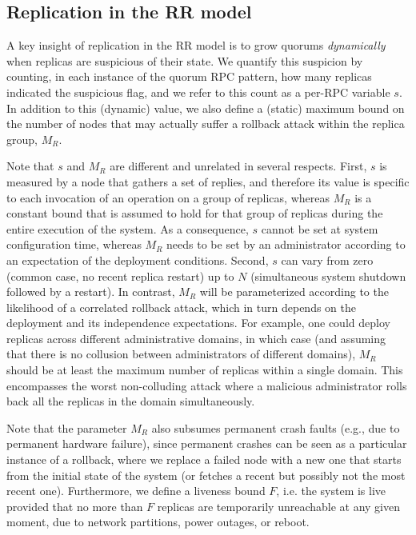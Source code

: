 \subsection{Replication in the \ac{RR} model}

A key insight of replication in the \ac{RR} model is to grow quorums
\emph{dynamically} when replicas are suspicious of their state.
We quantify this suspicion by counting, in each instance of the
quorum RPC pattern, how many replicas indicated the suspicious
flag, and we refer to this count as a per-RPC variable $s$.
In addition to this (dynamic) value, we also define a (static)
maximum bound on the number of nodes that may actually
suffer a rollback attack within the replica group, $M_R$.

Note that $s$ and $M_R$ are different and unrelated in several
respects. First, $s$ is measured by a node that gathers a set of
replies, and therefore its value is specific to each invocation
of an operation on a group of replicas, whereas $M_R$ is a
constant bound that is assumed to hold for that group of replicas
during the entire execution of the system. As a consequence, $s$
cannot be set at system configuration time, whereas $M_R$ needs
to be set by an administrator according to an expectation of the
deployment conditions. Second, $s$ can vary from zero (common
case, no recent replica restart) up to $N$ (simultaneous system
shutdown followed by a restart). In contrast, $M_R$ will be
parameterized according to the likelihood of a correlated
rollback attack, which in turn depends on the deployment and its
independence expectations. For example, one could deploy replicas
across different administrative domains, in which case (and
assuming that there is no collusion between administrators of
different domains), $M_R$ should be at least the maximum number
of replicas within a single domain. This encompasses the worst
non-colluding attack where a malicious administrator rolls back
all the replicas in the domain simultaneously.

Note that the parameter $M_R$ also subsumes permanent crash
faults (e.g., due to permanent hardware failure), since permanent
crashes can be seen as a particular instance of a rollback, where
we replace a failed node with a new one that starts from the
initial state of the system (or fetches a recent but possibly not
the most recent one).
%
Furthermore, we define a liveness bound $F$, i.e. the system is live
provided that no more than $F$ replicas are temporarily unreachable at
any given moment, due to network partitions, power outages, or reboot.

